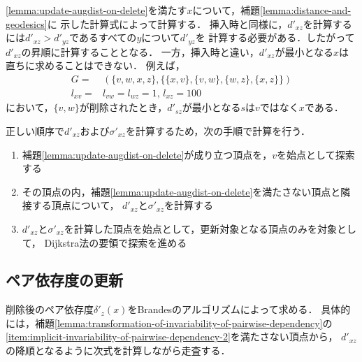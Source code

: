 \ref{lemma:update-augdist-on-delete}を満たす$x$について，補題\ref{lemma:distance-and-geodesics}に
示した計算式によって計算する．
挿入時と同様に，$d'_{xz}$を計算するには$d'_{xz}>d'_{yz}$であるすべての$y$について$d'_{yz}$を
計算する必要がある．したがって$d'_{xz}$の昇順に計算することとなる．
一方，挿入時と違い，$d'_{xz}$が最小となる$x$は直ちに求めることはできない．
例えば，
\begin{equation*}
  \begin{aligned}
    G=&(\{v,w,x,z\},\{\{x,v\},\{v,w\},\{w,z\},\{x,z\}\})\\
    l_{xv}=&l_{vw}=l_{wz}=1,\,l_{xz}=100
  \end{aligned}
\end{equation*}
において，$\{v,w\}$が削除されたとき，$d'_{sz}$が最小となる$s$は$v$ではなく$x$である．

正しい順序で$d'_{xz}$および$\sigma'_{xz}$を計算するため，次の手順で計算を行う．
\begin{enumerate}
\item 補題\ref{lemma:update-augdist-on-delete}が成り立つ頂点を，$v$を始点として探索する
\item その頂点の内，補題\ref{lemma:update-augdist-on-delete}を満たさない頂点と隣接する頂点について，
  $d'_{xz}$と$\sigma'_{xz}$を計算する
\item $d'_{xz}$と$\sigma'_{xz}$を計算した頂点を始点として，更新対象となる頂点のみを対象として，
  Dijkstra法の要領で探索を進める
\end{enumerate}

\subsection{ペア依存度の更新}
\label{subsect:update-delta-on-delete}

削除後のペア依存度$\delta'_z(x)$をBrandesのアルゴリズムによって求める．
具体的には，補題\ref{lemma:transformation-of-invariability-of-pairwise-dependency}の
\ref{item:implicit-invariability-of-pairwise-dependency-2}を満たさない頂点から，
$d'_{xz}$の降順となるように次式を計算しながら走査する．

